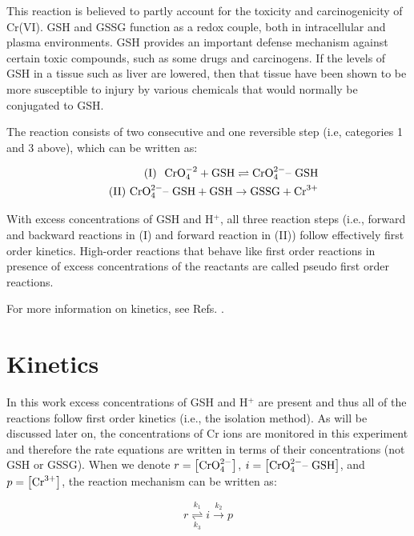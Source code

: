 \documentclass[byrevtex,amssymb,aps,pra,floatfix,letterpaper]{revtex4}
\begin{document}
\noindent
This reaction is believed to partly account for the toxicity and carcinogenicity of Cr(VI). GSH and GSSG function as a redox couple, both in intracellular and plasma environments. GSH provides an important defense mechanism against certain toxic compounds, such as some drugs and carcinogens. If the levels of GSH in a tissue such as liver are lowered, then that tissue have been shown to be more susceptible to injury by various chemicals that would normally be conjugated to GSH.

The reaction consists of two consecutive and one reversible step (i.e, categories 1 and 3 above), which can be written as:

\begin{eqnarray}
\label{eq3}
& & \textnormal{(I)\phantom{I} }\textnormal{CrO}_4^{-2} + \textnormal{GSH} \rightleftharpoons \textnormal{CrO}_4^{2-}\textnormal{-- GSH}\\
\nonumber
& & \textnormal{(II) } \textnormal{CrO}_4^{2-}\textnormal{-- GSH} + \textnormal{GSH} \rightarrow \textnormal{GSSG} + \textnormal{Cr}^{3+}
\end{eqnarray}

\noindent
With excess concentrations of GSH and H$^+$, all three reaction steps (i.e., forward and backward reactions in (I) and forward reaction in (II)) follow effectively first order kinetics. High-order reactions that behave like first order reactions in presence of excess concentrations of the reactants are called pseudo first order reactions.

For more information on kinetics, see Refs. \cite{ATKINS1,SILBEY,CHANG,COX}.

\section{Kinetics}

In this work excess concentrations of GSH and H$^+$ are present and thus all of the reactions follow first order kinetics (i.e., the isolation method). As will be discussed later on, the concentrations of Cr ions are monitored in this experiment and therefore the rate equations are written in terms of their concentrations (not GSH or GSSG). When we denote $r = \left[\textnormal{CrO}_4^{2-}\right]$, $i = \left[\textnormal{CrO}_4^{2-}\textnormal{-- GSH}\right]$, and $p = \left[\textnormal{Cr}^{3+}\right]$, the reaction mechanism can be written as:

\begin{equation}
\label{eq4}
r \mathop\rightleftharpoons\limits_{k_3}^{k_1} i \mathop\rightarrow\limits^{k_2} p
\end{equation}
\end{document}
